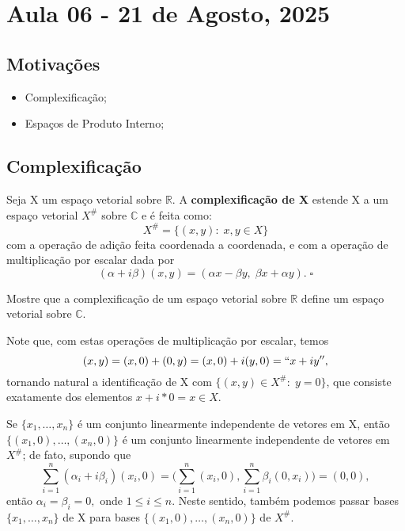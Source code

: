 \documentclass[../functional_analysis.tex]{subfiles}
\begin{document}
\section{Aula 06 - 21 de Agosto, 2025}
\subsection{Motivações}
\begin{itemize}
	\item Complexificação;
	\item Espaços de Produto Interno;
\end{itemize}
\subsection{Complexificação}
\begin{def*}
	Seja X um espaço vetorial sobre \(\mathbb{R}.\) A \textbf{complexificação de X} estende X a um espaço vetorial \(X^{\#}\) sobre \(\mathbb{C}\) e é feita como:
	\[
		X^{\#} = \{(x, y):\; x, y\in X\}
	\]
	com a operação de adição feita coordenada a coordenada, e com a operação de multiplicação por escalar dada por
	\[
		(\alpha +i\beta )(x, y) = (\alpha x - \beta y,\; \beta x + \alpha y).\; \square
	\]
\end{def*}
\begin{exr}
	Mostre que a complexificação de um espaço vetorial sobre \(\mathbb{R}\) define um espaço vetorial sobre \(\mathbb{C}.\)
\end{exr}
Note que, com estas operações de multiplicação por escalar, temos
\[
	(x, y) = (x,0)+(0,y)=(x,0)+i(y,0) = ``x+iy'',
\]
tornando natural a identificação de X com \(\{(x, y)\in X^{\#}:\; y =0\}\), que consiste exatamente dos elementos \(x+i*0 = x\in X\).

Se \(\{x_{1},\dotsc , x_{n}\}\) é um conjunto linearmente independente de vetores em X, então \(\{(x_1, 0), \dotsc , (x_{n}, 0)\}\) é um conjunto linearmente independente de vetores em \(X^{\#}\); de fato, supondo que
\[
	\sum\limits_{i=1}^{n}(\alpha_{i}+i\beta_{i})(x_{i}, 0) = \biggl(\sum\limits_{i=1}^{n}(x_{i}, 0), \sum\limits_{i=1}^{n}\beta_{i}(0, x_{i})\biggr) = (0, 0),
\]
então \(\alpha_{i} = \beta_{i} = 0,\) onde \(1\leq i\leq n.\) Neste sentido, também podemos passar bases \(\{x_1, \dotsc , x_{n}\}\) de X para bases \(\{(x_1, 0), \dotsc , (x_{n}, 0)\}\) de \(X^{\#}\).
\end{document}
